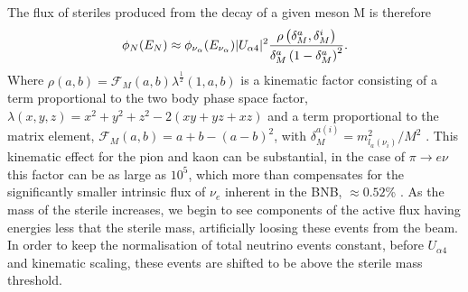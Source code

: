 \documentclass[11pt, a4paper]{article}
\def\ster{\ensuremath N}
\begin{document}
The flux of steriles produced from the decay of a given meson M is therefore
%
\[ \phi_{\ster}(E_{\ster}) \approx \phi_{\nu_\alpha} (E_{\nu_\alpha})\vert
U_{\alpha 4}\vert^2 \frac{\rho\left( \delta_M^a , \delta_M^i
\right)}{\delta_M^a \left(1- \delta_M^a\right)^2}.  \]
%
Where $\rho(a,b)=\mathcal{F}_M(a,b) \lambda^{\frac{1}{2}}(1,a,b)$ is a
kinematic factor consisting of a term proportional to the two body phase space
factor, $\lambda(x,y,z)=x^2+y^2+z^2-2(x y+yz+x z)$ and a term proportional to
the matrix element, $\mathcal{F}_M(a,b)= a+b -\left(a-b\right)^2$, with
$\delta_M^{a(i)}=m_{l_a(\nu_i)}^2/M^2$ \cite{PhysRevD.24.1232}. This kinematic
effect for the pion and kaon can be substantial, in the case of $\pi
\rightarrow e \nu$ this factor can be as large as $10^5$, which more than
compensates for the significantly smaller intrinsic flux of $\nu_e$  inherent
in the BNB, $\approx 0.52$\% \cite{AguilarArevalo:2008yp}. As the mass of the
sterile increases, we begin to see components of the active flux having
energies less that the sterile mass, artificially loosing these events from the
beam. In order to keep the normalisation of total neutrino events constant,
before $U_{\alpha 4}$ and kinematic scaling, these events are shifted to be
above the sterile mass threshold.
\end{document}
